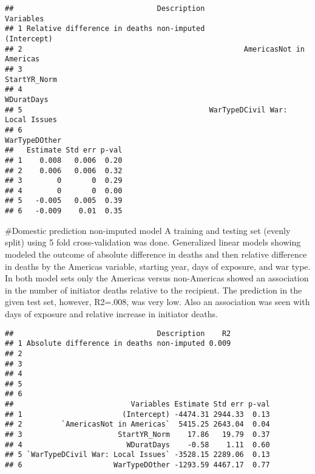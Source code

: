 \documentclass[
]{article}
\begin{document}
\begin{verbatim}
##                                 Description                       Variables
## 1 Relative difference in deaths non-imputed                     (Intercept)
## 2                                                   AmericasNot in Americas
## 3                                                              StartYR_Norm
## 4                                                                WDuratDays
## 5                                           WarTypeDCivil War: Local Issues
## 6                                                             WarTypeDOther
##   Estimate Std err p-val
## 1    0.008   0.006  0.20
## 2    0.006   0.006  0.32
## 3        0       0  0.29
## 4        0       0  0.00
## 5   -0.005   0.005  0.39
## 6   -0.009    0.01  0.35
\end{verbatim}

\#Domestic prediction non-imputed model A training and testing set
(evenly split) using 5 fold cross-validation was done. Generalized
linear models showing modeled the outcome of absolute difference in
deaths and then relative difference in deaths by the Americas variable,
starting year, days of exposure, and war type. In both model sets only
the Americas versus non-Americas showed an association in the number of
initiator deaths relative to the recipient. The prediction in the given
test set, however, R2=.008, was very low. Also an association was seen
with days of exposure and relative increase in initiator deaths.

\begin{verbatim}
##                                 Description    R2
## 1 Absolute difference in deaths non-imputed 0.009
## 2                                                
## 3                                                
## 4                                                
## 5                                                
## 6                                                
##                           Variables Estimate Std err p-val
## 1                       (Intercept) -4474.31 2944.33  0.13
## 2         `AmericasNot in Americas`  5415.25 2643.04  0.04
## 3                      StartYR_Norm    17.86   19.79  0.37
## 4                        WDuratDays    -0.58    1.11  0.60
## 5 `WarTypeDCivil War: Local Issues` -3528.15 2289.06  0.13
## 6                     WarTypeDOther -1293.59 4467.17  0.77
\end{verbatim}
\end{document}
